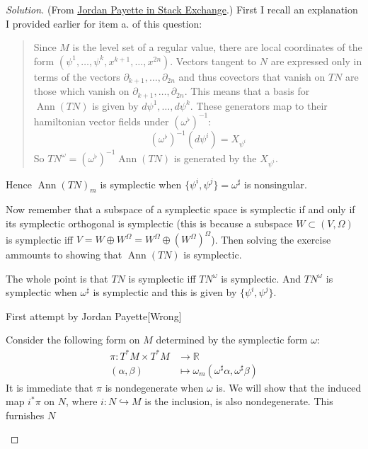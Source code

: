 \begin{proof}[Solution]\leavevmode
	(From \href{https://math.stackexchange.com/questions/4974063/level-set-submanifold-is-symplectic-iff-poisson-bracket-matrix-is-nonsingular?noredirect=1#comment10675364_4974063}{Jordan Payette in Stack Exchange}.) \hspace{0.5em} 
	First I recall an explanation I provided earlier for item a. of this question:

\begin{quotation}
		Since $M$ is the level set of a regular value, there are local coordinates of the form $(\psi^1,\ldots,\psi^k,x^{k+1},\ldots,x^{2n})$. Vectors tangent to $N$ are expressed only in terms of the vectors $\partial_{k+1},\ldots,\partial_{2n}$ and thus covectors that vanish on $T N$ are those which vanish on $\partial_{k+1},\ldots, \partial_{2n}$. This means that a basis for $\operatorname{Ann}(T N)$ is given by $d\psi^1,\ldots,d\psi^k$. These generators map to their hamiltonian vector fields under $(\omega^\flat)^{-1}$:
\[\left(\omega^\flat \right)^{-1}(d\psi^i)=X_{\psi^i}\]
So $T N^\omega= (\omega^\flat)^{-1}\operatorname{Ann}(TN)$ is generated by the $X_{\psi^i}$.
\end{quotation}

Hence $\operatorname{Ann}(TN)_m$ is symplectic when $\{\psi^i,\psi^j\}=\omega^\sharp$ is nonsingular.

Now remember that a subspace of a symplectic space is symplectic if and only if its symplectic orthogonal is symplectic (this is because  a subspace  $W\subset(V,\Omega)$ is symplectic iff $V=W\oplus W^\Omega=W^\Omega\oplus (W^\Omega)^\Omega$). Then solving the exercise ammounts to showing that $\operatorname{Ann}(TN)$ is symplectic.

\begin{upshot}\leavevmode
	The whole point is that $TN$ is symplectic iff $TN^\omega$ is symplectic. And $TN^\omega$ is symplectic when $\omega ^\sharp$ is symplectic and this is given by $\{\psi^i,\psi^j\}$.
\end{upshot}


\begin{idea5}{First attempt by Jordan Payette}[Wrong]\leavevmode
	
	Consider the following form on $M$ determined by the symplectic form $\omega$:
	\begin{align*}
		\pi: T^*M\times T^*M  &\longrightarrow \mathbb{R} \\
		(\alpha,\beta) &\longmapsto \omega_m(\omega ^\sharp\alpha,\omega ^\sharp\beta)
	\end{align*}
It is immediate that $\pi$ is nondegenerate when $\omega$ is. We will show that the induced map $i^*\pi$ on $N$, where $i:N\hookrightarrow M$ is the inclusion, is also nondegenerate. This furnishes $N$


\end{idea5}
\end{proof}
